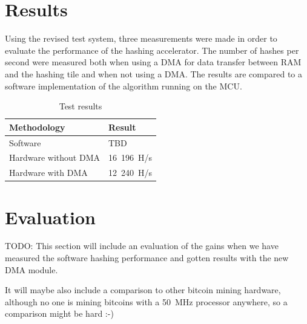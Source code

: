 \section{Results}

Using the revised test system, three measurements were made in order to evaluate the
performance of the hashing accelerator. The number of hashes per second were measured
both when using a DMA for data transfer between RAM and the hashing tile and when not
using a DMA. The results are compared to a software implementation of the algorithm
running on the MCU.

\begin{table}[ht]
	\centering
	\begin{tabular}{|l|l|}
		\hline
		\textbf{Methodology} & \textbf{Result} \\
		\hline
		Software & TBD \\
		Hardware without DMA & 16~196~H/s\\
		Hardware with DMA & 12~240~H/s\\
		\hline
	\end{tabular}

	\caption{Test results}
\end{table}

\section{Evaluation}

TODO:
This section will include an evaluation of the gains when we have measured the software
hashing performance and gotten results with the new DMA module.

It will maybe also include a comparison to other bitcoin mining hardware, although
no one is mining bitcoins with a 50~MHz processor anywhere, so a comparison might
be hard :-)

